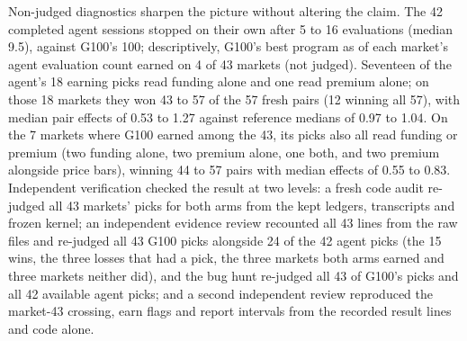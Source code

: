 \documentclass[11pt]{article}
\begin{document}
Non-judged diagnostics sharpen the picture without altering the claim. The 42 completed agent sessions stopped on their own after 5 to 16 evaluations (median 9.5), against G100's 100; descriptively, G100's best program as of each market's agent evaluation count earned on 4 of 43 markets (not judged). Seventeen of the agent's 18 earning picks read funding alone and one read premium alone; on those 18 markets they won 43 to 57 of the 57 fresh pairs (12 winning all 57), with median pair effects of 0.53 to 1.27 against reference medians of 0.97 to 1.04. On the 7 markets where G100 earned among the 43, its picks also all read funding or premium (two funding alone, two premium alone, one both, and two premium alongside price bars), winning 44 to 57 pairs with median effects of 0.55 to 0.83. Independent verification checked the result at two levels: a fresh code audit re-judged all 43 markets' picks for both arms from the kept ledgers, transcripts and frozen kernel; an independent evidence review recounted all 43 lines from the raw files and re-judged all 43 G100 picks alongside 24 of the 42 agent picks (the 15 wins, the three losses that had a pick, the three markets both arms earned and three markets neither did), and the bug hunt re-judged all 43 of G100's picks and all 42 available agent picks; and a second independent review reproduced the market-43 crossing, earn flags and report intervals from the recorded result lines and code alone.
\end{document}
